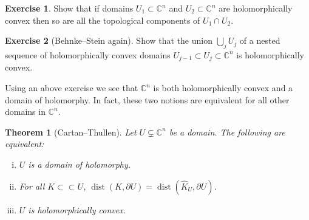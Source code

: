 \documentclass[12pt,openany]{book}
\newcommand{\C}{{\mathbb{C}}}
\theoremstyle{plain}
\newtheorem{thm}{Theorem}[section]
\theoremstyle{remark}
\theoremstyle{definition}
\newenvironment{exbox}{%
    \def\FrameCommand{\vrule width 1pt \relax\hspace {10pt}}%
    \MakeFramed {\advance \hsize -\width \FrameRestore }%
}{%
    \endMakeFramed
}
\theoremstyle{exercise}
\newtheorem{exercise}{Exercise}[section]
\theoremstyle{example}
\begin{document}
\begin{exbox}
\begin{exercise}
Show that if domains $U_1 \subset \C^n$ and $U_2 \subset \C^n$ are
holomorphically convex
then so are all the topological components of $U_1 \cap U_2$.
\end{exercise}

\begin{exercise}[Behnke--Stein again]
Show that the union $\bigcup_j U_j$ of a nested sequence of holomorphically
convex domains $U_{j-1} \subset U_j \subset \C^n$ is holomorphically convex.
\end{exercise}
\end{exbox}

Using an above exercise we see that $\C^n$ is both holomorphically convex and
a domain of holomorphy.  In fact, these two notions are equivalent for all
other domains in $\C^n$.

\begin{thm}[Cartan--Thullen]
\label{thm:cartthul}
Let $U \subsetneq \C^n$ be a domain.  The following are equivalent:
\begin{enumerate}[(i)]
\item \label{thm:cartthul:domhol}
$U$ is a domain of holomorphy.
\item \label{thm:cartthul:disthull}
For all $K \subset \subset U$,
$\operatorname{dist}(K,\partial U) = \operatorname{dist}(\widehat{K}_U,\partial U)$.
\item \label{thm:cartthul:holconv}
$U$ is holomorphically convex.
\end{enumerate}
\end{thm}
\end{document}

